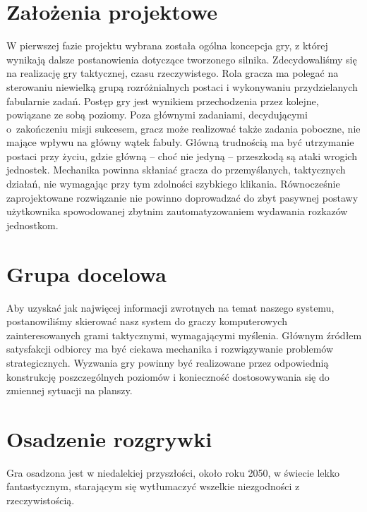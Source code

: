 \documentclass[licencjacka]{pracamgr}
\begin{document}
  \section{Założenia projektowe}
    W pierwszej fazie projektu wybrana została ogólna koncepcja gry, z której wynikają dalsze postanowienia dotyczące
    tworzonego silnika. Zdecydowaliśmy się na realizację gry taktycznej, czasu rzeczywistego. Rola gracza ma polegać
    na sterowaniu niewielką grupą rozróżnialnych postaci i wykonywaniu przydzielanych fabularnie zadań. Postęp gry jest 
    wynikiem przechodzenia przez kolejne, powiązane ze sobą poziomy. Poza głównymi zadaniami, decydującymi o~zakończeniu
    misji sukcesem, gracz może realizować także zadania poboczne, nie mające wpływu na główny wątek fabuły. Główną
    trudnością ma być utrzymanie postaci przy życiu, gdzie główną -- choć nie jedyną -- przeszkodą są ataki wrogich jednostek.
    Mechanika powinna skłaniać gracza do przemyślanych, taktycznych działań, nie wymagając przy tym zdolności szybkiego klikania. 
    Równocześnie zaprojektowane rozwiązanie nie powinno doprowadzać do zbyt pasywnej postawy użytkownika spowodowanej zbytnim
    zautomatyzowaniem wydawania rozkazów jednostkom.

  \section{Grupa docelowa}
    Aby uzyskać jak najwięcej informacji zwrotnych na temat naszego systemu, postanowiliśmy skierować nasz system do
    graczy komputerowych zainteresowanych grami taktycznymi, wymagającymi myślenia. Głównym źródłem satysfakcji
    odbiorcy ma być ciekawa mechanika i rozwiązywanie problemów strategicznych. Wyzwania gry powinny być realizowane przez
    odpowiednią konstrukcję poszczególnych poziomów i konieczność dostosowywania się do zmiennej sytuacji na planszy.

  \section{Osadzenie rozgrywki}
    Gra osadzona jest w niedalekiej przyszłości, około roku 2050, w świecie lekko fantastycznym, starającym się wytłumaczyć
    wszelkie niezgodności z rzeczywistością. 
\end{document}
